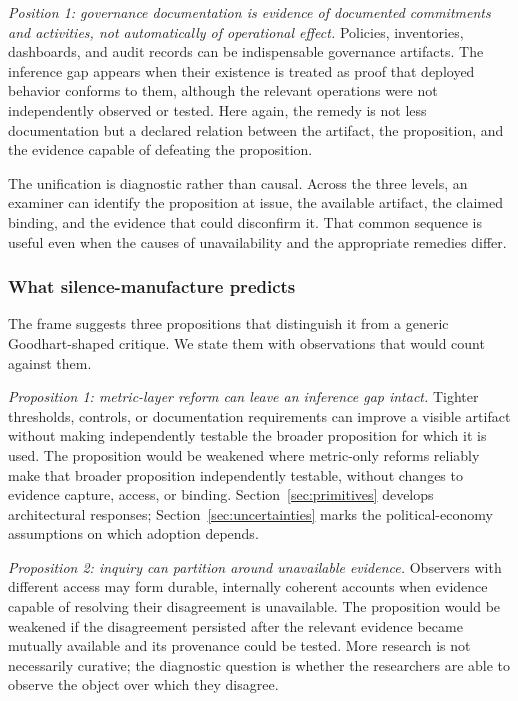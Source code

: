 \emph{Position 1: governance documentation is evidence of documented
commitments and activities, not automatically of operational effect.} Policies,
inventories, dashboards, and audit records can be indispensable governance
artifacts. The inference gap appears when their existence is treated as proof
that deployed behavior conforms to them, although the relevant operations were
not independently observed or tested. Here again, the remedy is not less
documentation but a declared relation between the artifact, the proposition,
and the evidence capable of defeating the proposition.

The unification is diagnostic rather than causal. Across the three levels, an
examiner can identify the proposition at issue, the available artifact, the
claimed binding, and the evidence that could disconfirm it. That common sequence
is useful even when the causes of unavailability and the appropriate remedies
differ.

\subsubsection{What silence-manufacture predicts}
\label{sec:diagnostics:silence-manufacture:predictions}

The frame suggests three propositions that distinguish it from a generic
Goodhart-shaped critique. We state them with observations that would count
against them.

\emph{Proposition 1: metric-layer reform can leave an inference gap intact.}
Tighter thresholds, controls, or documentation requirements can improve a
visible artifact without making independently testable the broader proposition
for which it is used. The proposition would be weakened where metric-only
reforms reliably make that broader proposition independently testable, without
changes to evidence capture, access, or binding. Section~\ref{sec:primitives}
develops architectural responses; Section~\ref{sec:uncertainties} marks the
political-economy assumptions on which adoption depends.

\emph{Proposition 2: inquiry can partition around unavailable evidence.}
Observers with different access may form durable, internally coherent accounts
when evidence capable of resolving their disagreement is unavailable. The
proposition would be weakened if the disagreement persisted after the relevant
evidence became mutually available and its provenance could be tested. More
research is not necessarily curative; the diagnostic question is whether the
researchers are able to observe the object over which they disagree.

